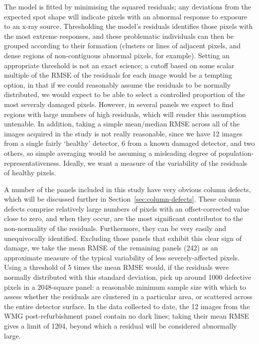 \documentclass[\main/IO-Pixels.tex]{subfiles}
\begin{document}
The model is fitted by minimising the squared residuals; any deviations from the expected spot shape will indicate pixels with an abnormal response to exposure to an x-ray source. Thresholding the model's residuals identifies those pixels with the most extreme responses, and these problematic individuals can then be grouped according to their formation (clusters or lines of adjacent pixels, and dense regions of non-contiguous abnormal pixels, for example). Setting an appropriate threshold is not an exact science; a cutoff based on some scalar multiple of the RMSE of the residuals for each image would be a tempting option, in that if we could reasonably assume the residuals to be normally distributed, we would expect to be able to select a controlled proportion of the most severaly damaged pixels. However, in several panels we expect to find regions with large numbers of high residuals, which will render this assumption untenable. In addition, taking a simple mean/median RMSE across all of the images acquired in the study is not really reasonable, since we have 12 images from a single fairly `healthy' detector, 6 from a known damaged detector, and two others, so simple averaging would be assuming a misleading degree of population-representativeness. Ideally, we want a measure of the variability of the residuals of healthy pixels.

A number of the panels included in this study have very obvious column defects, which will be discussed further in Section~\ref{sec:column-defects}. These column defects comprise relatively large numbers of pixels with an offset-corrected value close to zero, and when they occur, are the most significant contributor to the non-normality of the residuals. Furthermore, they can be very easily and unequivocally identified. Excluding those panels that exhibit this clear sign of damage, we take the mean RMSE of the remaining panels (242) as an approximate measure of the typical variability of less severely-affected pixels. Using a threshold of 5 times the mean RMSE would, if the residuals were normally distributed with this standard deviation, pick up around 1000 defective pixels in a 2048-square panel: a reasonable minimum sample size with which to assess whether the residuals are clustered in a particular area, or scattered across the entire detector surface. In the data collected to date, the 12 images from the WMG post-refurbishment panel contain no dark lines; taking their mean RMSE gives a limit of 1204, beyond which a residual will be considered abnormally large.
\end{document}
